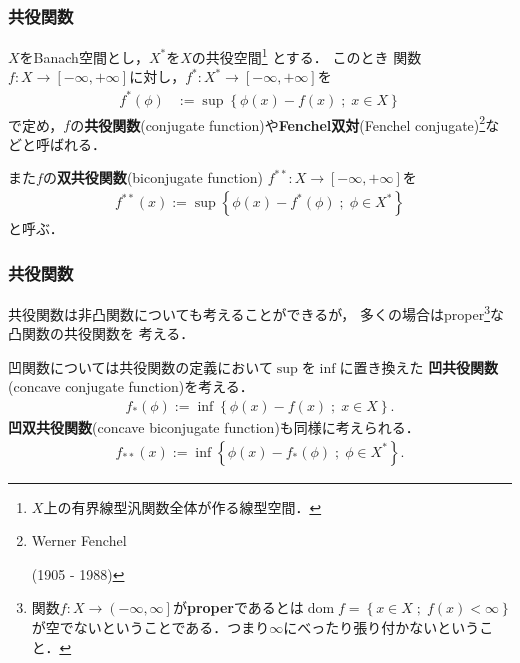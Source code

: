 \documentclass[10pt,hyperref={unicode}]{beamer}
\DeclareMathOperator*{\dom}{dom}
\newcommand{\parentheses}[1]{\left(#1\right)}
\newcommand{\leftopenrightclose}[1]{\left(\left.#1\right]\right.}
\newcommand{\braces}[1]{\left\{#1\right\}}
\newcommand{\brackets}[1]{\left[#1\right]}
\begin{document}
\begin{frame}
\frametitle{共役関数}
$X$をBanach空間とし，$X^*$を$X$の共役空間\footnote[frame]{$X$上の有界線型汎関数全体が作る線型空間．}
とする．
このとき
関数
$f:X \to \brackets{-\infty,+\infty}$に対し，$f^*: X^* \to \brackets{-\infty,+\infty}$を
\begin{align*}
    f^*\parentheses{\phi} &:= \sup \braces{\phi\parentheses{x} - f\parentheses{x} \;;\; x \in X}
\end{align*}
で定め，$f$の\textbf{共役関数}(conjugate function)や\textbf{Fenchel双対}(Fenchel conjugate)\footnote[frame]{Werner Fenchel \begin{ipafont}\end{ipafont} (1905 - 1988)}\nocite{borwein2010convex}などと呼ばれる．

\bigskip

また$f$の\textbf{双共役関数}(biconjugate function) $f^{**}: X \to \brackets{-\infty,+\infty}$を
\begin{align*}
    f^{**}\parentheses{x} := \sup \braces{\phi(x) - f^*\parentheses{\phi} \;;\; \phi \in X^*}
\end{align*}
と呼ぶ．

\end{frame}

\begin{frame}
\frametitle{共役関数}
共役関数は非凸関数についても考えることができるが，
多くの場合はproper\footnote[frame]{関数$f:X\to\leftopenrightclose{-\infty,\infty}$が\textbf{proper}であるとは$\dom f = \braces{x \in X\;;\; f\parentheses{x} < \infty}$が空でないということである．つまり$\infty$にべったり張り付かないということ．}な凸関数の共役関数を
考える．

\bigskip

凹関数については共役関数の定義において$\sup$を$\inf$に置き換えた
\textbf{凹共役関数}(concave conjugate function)を考える．
\begin{align*}
    f_*\parentheses{\phi} := \inf \braces{\phi\parentheses{x} - f\parentheses{x} \;;\; x \in X}.
\end{align*}
\textbf{凹双共役関数}(concave biconjugate function)も同様に考えられる．
\begin{align*}
    f_{**}\parentheses{x} := \inf \braces{\phi\parentheses{x} - f_*\parentheses{\phi} \;;\; \phi \in X^*}.
\end{align*}
\end{frame}
\end{document}
